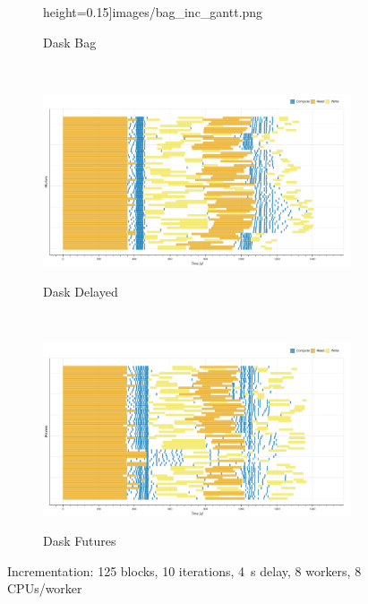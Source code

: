 \documentclass[conference]{IEEEtran}
\begin{document}
\begin{figure}[!b]
\begin{subfigure}[b]{\columnwidth}
{        height=0.15\textheight]{images/bag_inc_gantt.png}}
        \caption{Dask Bag}\label{fig:inc_dask_bag_gantt}
    \end{subfigure}
    \\
    \begin{subfigure}[b]{\columnwidth}
        \href{https://zenodo.org/record/3354434/files/dask-delayed-inc-baseline.html?download=1}{
        \includegraphics[clip,width=\columnwidth,
        height=0.15\textheight]{images/delayed_inc_gantt.png}}
        \caption{Dask Delayed}\label{fig:inc_dask_delayed_gantt}
    \end{subfigure}
    \\
    \begin{subfigure}[b]{\columnwidth}
        \href{https://zenodo.org/record/3354434/files/dask-futures-inc-baseline.html?download=1}{
        \includegraphics[clip,width=\columnwidth,
        height=0.15\textheight]{images/futures_inc_gantt.png}}
        \caption{Dask Futures}\label{fig:inc_dask_futures_gantt}
    \end{subfigure}
    \caption{Incrementation: 125 blocks, 10 iterations, \SI{4}{\second} delay, 8 workers,
8 CPUs/worker}\label{fig:inc_gantt}
\end{figure}
\end{document}

